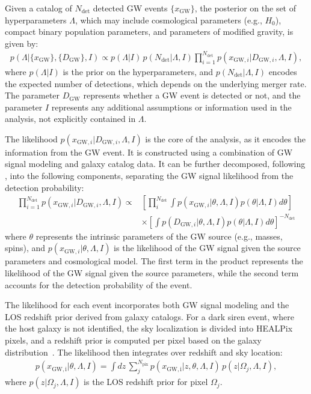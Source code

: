 Given a catalog of $N_{\mathrm{det}}$ detected \ac{GW} events $\{x_\mathrm{GW}\}$, the posterior on the set of hyperparameters $\Lambda$, which may include cosmological parameters (e.g., $H_0$), compact binary population parameters, and parameters of modified gravity, is given by:
\begin{align}
    p(\Lambda | \{x_\mathrm{GW}\},\{D_\mathrm{GW}\}, I) \propto p(\Lambda | I)\, p(N_{\mathrm{det}} | \Lambda, I) \prod_{i=1}^{N_{\mathrm{det}}} p(x_{\mathrm{GW},i} | D_{\mathrm{GW},i}, \Lambda, I),
\end{align}
where $p(\Lambda | I)$ is the prior on the hyperparameters, and $p(N_{\mathrm{det}} | \Lambda, I)$ encodes the expected number of detections, which depends on the underlying merger rate. The parameter $D_\mathrm{GW}$ represents whether a \ac{GW} event is detected or not, and the parameter $I$ represents any additional assumptions or information used in the analysis, not explicitly contained in $\Lambda$.

The likelihood $p(x_{\mathrm{GW},i} | D_{\mathrm{GW},i}, \Lambda, I)$ is the core of the analysis, as it encodes the information from the \ac{GW} event. It is constructed using a combination of \ac{GW} signal modeling and galaxy catalog data. It can be further decomposed, following \citet{chen2024testing}, into the following components, separating the \ac{GW} signal likelihood from the detection probability:
\begin{align}
    \prod_{i=1}^{N_{\mathrm{det}}} p(x_{\mathrm{GW},i} | D_{\mathrm{GW},i}, \Lambda, I) \propto & \left[ \prod_i^{N_{\mathrm{det}}} \int p(x_{\mathrm{GW},i} | \theta, \Lambda, I) p(\theta | \Lambda, I) d\theta\right] \\ \nonumber
    & \times \left[ \int p(D_{\mathrm{GW},i} | \theta, \Lambda, I)p(\theta | \Lambda, I) d\theta \right]^{-N_{\mathrm{det}}}
\end{align}
where $\theta$ represents the intrinsic parameters of the \ac{GW} source (e.g., masses, spins), and $p(x_{\mathrm{GW},i} | \theta, \Lambda, I)$ is the likelihood of the \ac{GW} signal given the source parameters and cosmological model. The first term in the product represents the likelihood of the \ac{GW} signal given the source parameters, while the second term accounts for the detection probability of the event.

The likelihood for each event incorporates both \ac{GW} signal modeling and the \acf{LOS} redshift prior derived from galaxy catalogs. For a dark siren event, where the host galaxy is not identified, the sky localization is divided into HEALPix pixels, and a redshift prior is computed per pixel based on the galaxy distribution~\citep{gray2020cosmological,chen2024testing}. The likelihood then integrates over redshift and sky location:
\begin{align}
    p(x_{\mathrm{GW,i}} | \theta, \Lambda, I) = \int dz\, \sum_{j}^{N_{\mathrm{pix}}} p(x_{\mathrm{GW,i}} | z, \theta, \Lambda, I)\, p(z | \Omega_j, \Lambda, I),
\end{align}
where $p(z | \Omega_j, \Lambda, I)$ is the LOS redshift prior for pixel $\Omega_j$.

